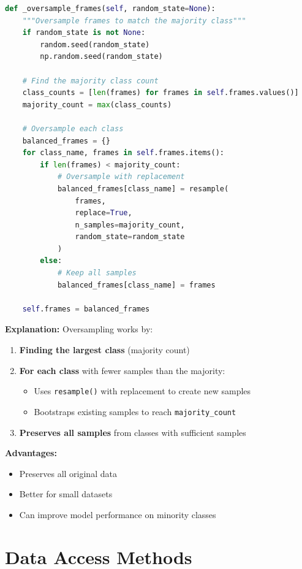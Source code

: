 \documentclass[10pt]{book}
\begin{document}
\begin{lstlisting}[language=Python]
def _oversample_frames(self, random_state=None):
    """Oversample frames to match the majority class"""
    if random_state is not None:
        random.seed(random_state)
        np.random.seed(random_state)
    
    # Find the majority class count
    class_counts = [len(frames) for frames in self.frames.values()]
    majority_count = max(class_counts)
    
    # Oversample each class
    balanced_frames = {}
    for class_name, frames in self.frames.items():
        if len(frames) < majority_count:
            # Oversample with replacement
            balanced_frames[class_name] = resample(
                frames, 
                replace=True, 
                n_samples=majority_count, 
                random_state=random_state
            )
        else:
            # Keep all samples
            balanced_frames[class_name] = frames
    
    self.frames = balanced_frames
\end{lstlisting}

\textbf{Explanation:}
Oversampling works by:
\begin{enumerate}
\item \textbf{Finding the largest class} (majority count)
\item \textbf{For each class} with fewer samples than the majority:
  \begin{itemize}
  \item Uses \texttt{resample()} with replacement to create new samples
  \item Bootstraps existing samples to reach \texttt{majority\_count}
  \end{itemize}
\item \textbf{Preserves all samples} from classes with sufficient samples
\end{enumerate}

\textbf{Advantages:}
\begin{itemize}
\item Preserves all original data
\item Better for small datasets
\item Can improve model performance on minority classes
\end{itemize}

\section{Data Access Methods}
\end{document}
